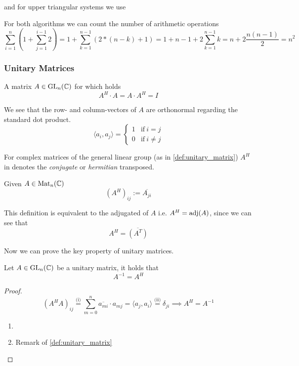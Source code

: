 
and for upper triangular systems we use


For both algorithms we can count the number of arithmetic operations
\[\sum_{i=1}^n \left(1 + \sum_{j=1}^{i-1} 2\right) = 1 + \sum_{k=1}^{n-1} (2 * (n - k) + 1) = 1 + n-1 + 2\sum_{k=1}^{n-1} k = n + 2 \frac{n(n-1)}{2} = n^2\]

\subsubsection{Unitary Matrices}
\begin{definition}\label{def:unitary_matrix}
   A matrix \(A \in \operatorname{GL}_n(\mathbb{C})\) for which holds
   \[A^H \cdot A = A \cdot A^H = I\]
\end{definition}
\begin{remark}
   We see that the row- and column-vectors of \(A\) are orthonormal regarding the standard dot product.
   \[\langle a_i, a_j \rangle = \begin{cases} 1 & \text{if}~i = j\\ 0 & \text{if}~i \neq j\end{cases}\]
\end{remark}

For complex matrices of the general linear group (as in \cref{def:unitary_matrix}) \(A^H\) in denotes the \emph{conjugate} or \emph{hermitian} transposed.
\begin{definition}
   Given \(A \in \operatorname{Mat}_n(\mathbb{C})\)
   \[(A^H)_{ij} := \overline{A_{ji}}\]
\end{definition}
\begin{remark}
   This definition is equivalent to the adjugated of \(A\) i.e. \(A^H = \operatorname{adj}(A)\), since we can see that
   \[A^H = \overline{(A^T)}\]
\end{remark}

Now we can prove the key property of unitary matrices.
\begin{proposition}
   Let \(A \in \operatorname{GL}_n(\mathbb{C})\) be a unitary matrix, it holds that
   \[A^{-1} = A^H\]
\end{proposition}
\begin{proof}
   \[(A^HA)_{ij} \overset{\text{(i)}}{=} \sum_{m=0}^n \overline{a_{mi}} \cdot a_{mj} = \langle a_j, a_i \rangle \overset{\text{(ii)}}{=} \delta_{ji} \implies A^H = A^{-1}\]
   \begin{enumerate}[label=\roman*, align=Center]
      \item {}
      \item Remark of \cref{def:unitary_matrix}
   \end{enumerate}
\end{proof}

